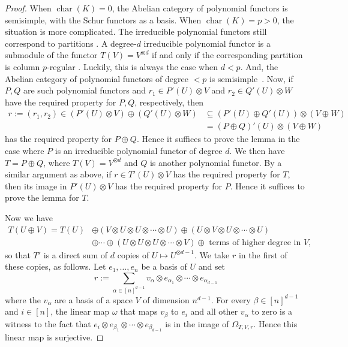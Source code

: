 \documentclass{amsart}
\theoremstyle{plain}
\theoremstyle{definition}
\DeclareMathOperator{\cha}{char}
\begin{document}
\begin{proof}
When $\cha(K)=0$, the Abelian category of polynomial functors is semisimple, with the Schur functors as a basis. When $\cha(K)=p>0$, the situation is more complicated. The irreducible polynomial functors still correspond to partitions \cite[Theorem 3.5]{G:polyreps}. A degree-$d$ irreducible polynomial functor is a submodule of the functor $T(V)=V^{\otimes d}$ if and only if the corresponding partition is column $p$-regular \cite[Theorem 3.2]{J:decompprime}. %
 Luckily, this is always the case when $d<p$. And, the Abelian category of polynomial functors of degree $<p$ is semisimple~\cite[Corollary 2.6e]{G:polyreps}. Now, if
$P,Q$ are such polynomial functors and $r_1 \in P'(U) \otimes
V$ and $r_2 \in Q'(U) \otimes W$ have the required property for
$P,Q$, respectively, then
\begin{align*}
r:=(r_1,r_2) \in (P'(U) \otimes V) \oplus (Q'(U)
\otimes W) &\subseteq (P'(U) \oplus Q'(U)) \otimes (V
\oplus W)\\ & = (P\oplus Q)'(U) \otimes (V \oplus W)
\end{align*}
has the required property for $P\oplus Q$. Hence it suffices to prove the lemma
in the case where $P$ is an irreducible polynomial functor of degree $d$.
We then have $T=P \oplus Q$, where $T(V)=V^{\otimes d}$ and $Q$ is another
polynomial functor. By a similar argument as above, if $r \in T'(U)
\otimes V$ has the required property for $T$, then its image in $P'(U)
\otimes V$ has the required property for $P$. Hence it suffices to prove
the lemma for $T$.

Now  we have
\begin{align*} T(U \oplus V)=T(U) &\oplus
(V \otimes U \otimes U \otimes \cdots \otimes U)  \oplus
(U \otimes V \otimes U \otimes \cdots \otimes U) \\ &  \oplus
\cdots
\oplus
(U \otimes U \otimes U \otimes \cdots \otimes V) \oplus
\text{ terms of higher degree in $V$,}
\end{align*}
so that $T'$ is a direct sum of $d$ copies of $U \mapsto
U^{\otimes d-1}$. We
take $r$ in the first of these copies, as follows. Let $e_1,\ldots,e_n$
be a basis of $U$ and set
\[ r:=\sum_{\alpha \in [n]^{d-1}}
v_{\alpha} \otimes e_{\alpha_1} \otimes \cdots \otimes
e_{\alpha_{d-1}} \]
where the $v_\alpha$ are a basis of a space $V$ of dimension
$n^{d-1}$. For every $\beta \in [n]^{d-1}$ and $i \in [n]$, the linear map
$\omega$ that maps $v_{\beta}$ to $e_i$ and all other
$v_\alpha$ to zero is a witness to the fact that $e_i
\otimes e_{\beta_1} \otimes \cdots \otimes e_{\beta_{d-1}}$
is in the image of $\Omega_{T,V,r}$. Hence this linear map
is surjective.
\end{proof}
\end{document}

